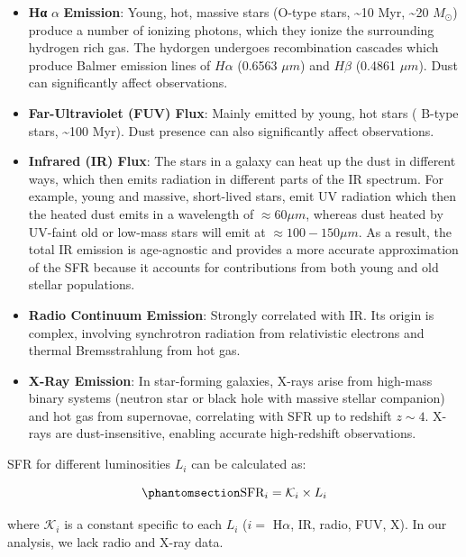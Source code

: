 \documentclass[
]{article}
\begin{document}
\begin{itemize}
\item
  \textbf{Hα} \boldmath\(\alpha\) \textbf{Emission}: Young, hot, massive
  stars (O-type stars, \textasciitilde10 Myr, \textasciitilde20
  \(M_\odot\)) produce a number of ionizing photons, which they ionize
  the surrounding hydrogen rich gas. The hydorgen undergoes
  recombination cascades which produce Balmer emission lines of
  \(H\alpha\) (0.6563 \(\mu m\)) and \(H\beta\) (0.4861 \(\mu m\)). Dust
  can significantly affect observations.
\item
  \textbf{Far-Ultraviolet (FUV) Flux}: Mainly emitted by young, hot
  stars ( B-type stars, \textasciitilde100 Myr). Dust presence can also
  significantly affect observations.
\item
  \textbf{Infrared (IR) Flux}: The stars in a galaxy can heat up the
  dust in different ways, which then emits radiation in different parts
  of the IR spectrum. For example, young and massive, short-lived stars,
  emit UV radiation which then the heated dust emits in a wavelength of
  \(\approx 60 \mu m\), whereas dust heated by UV-faint old or low-mass
  stars will emit at \(\approx 100-150\mu m\). As a result, the total IR
  emission is age-agnostic and provides a more accurate approximation of
  the SFR because it accounts for contributions from both young and old
  stellar populations.
\item
  \textbf{Radio Continuum Emission}: Strongly correlated with IR. Its
  origin is complex, involving synchrotron radiation from relativistic
  electrons and thermal Bremsstrahlung from hot gas.
\item
  \textbf{X-Ray Emission}: In star-forming galaxies, X-rays arise from
  high-mass binary systems (neutron star or black hole with massive
  stellar companion) and hot gas from supernovae, correlating with SFR
  up to redshift \(z \sim 4\). X-rays are dust-insensitive, enabling
  accurate high-redshift observations.
\end{itemize}

SFR for different luminosities \(L_i\) can be calculated as:

\begin{equation}\phantomsection\label{eq-sfr-spectra}{
\text{SFR}_i = \mathcal{K}_i\times L_i
}\end{equation}

where \(\mathcal{K}_i\) is a constant specific to each \(L_i\) (\(i =\)
H\(\alpha\), IR, radio, FUV, X). In our analysis, we lack radio and
X-ray data.
\end{document}
